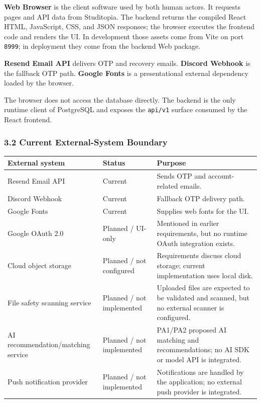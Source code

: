 \documentclass[12pt]{article}
\renewcommand{\baselinestretch}{1.5}
\begin{document}
\textbf{Web Browser} is the client software used by both human actors. It requests pages and API data from Studitopia. The backend returns the compiled React HTML, JavaScript, CSS, and JSON responses; the browser executes the frontend code and renders the UI. In development those assets come from Vite on port \texttt{8999}; in deployment they come from the backend Web package.
\par\medskip

\textbf{Resend Email API} delivers OTP and recovery emails. \textbf{Discord Webhook} is the fallback OTP path. \textbf{Google Fonts} is a presentational external dependency loaded by the browser.
\par\medskip

The browser does not access the database directly. The backend is the only runtime client of PostgreSQL and exposes the \texttt{api/v1} surface consumed by the React frontend.
\par\medskip

\hypertarget{sec:3-2-current-external-system-boundary}{}
\subsubsection*{3.2 Current External-System Boundary}
\par\medskip

\begingroup
\small
\renewcommand{\baselinestretch}{1.0}\selectfont
\renewcommand{\arraystretch}{1.15}
\setlength{\tabcolsep}{6pt}
\begin{longtable}{|>{\raggedright\arraybackslash}p{}|>{\raggedright\arraybackslash}p{}|>{\raggedright\arraybackslash}p{}|}
\hline
\textbf{External system} & \textbf{Status} & \textbf{Purpose} \\ \hline
\endhead
Resend Email API & Current & Sends OTP and account-related emails. \\ \hline
Discord Webhook & Current & Fallback OTP delivery path. \\ \hline
Google Fonts & Current & Supplies web fonts for the UI. \\ \hline
Google OAuth 2.0 & Planned / UI-only & Mentioned in earlier requirements, but no runtime OAuth integration exists. \\ \hline
Cloud object storage & Planned / not configured & Requirements discuss cloud storage; current implementation uses local disk. \\ \hline
File safety scanning service & Planned / not implemented & Uploaded files are expected to be validated and scanned, but no external scanner is configured. \\ \hline
AI recommendation/matching service & Planned / not implemented & PA1/PA2 proposed AI matching and recommendations; no AI SDK or model API is integrated. \\ \hline
Push notification provider & Planned / not implemented & Notifications are handled by the application; no external push provider is integrated. \\ \hline
\end{longtable}
\endgroup
\par\medskip
\end{document}
